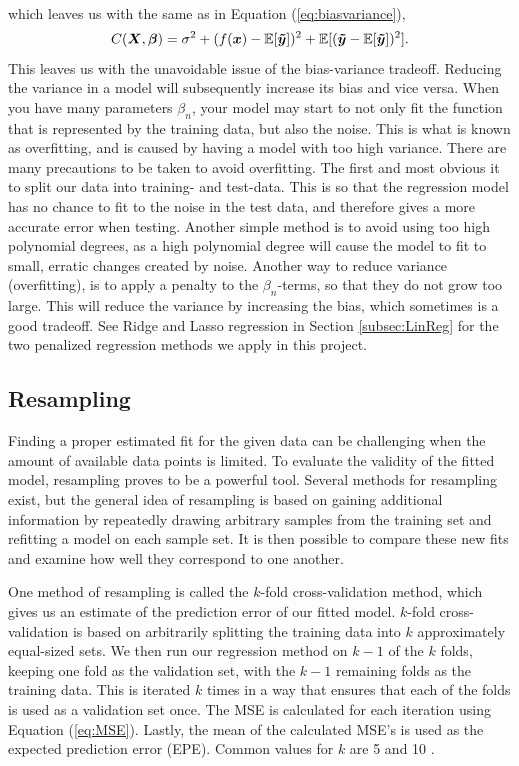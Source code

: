 \documentclass[a4paper, 10pt]{article}
\begin{document}
\begin{multicols}{2}
\begin{align*}
\end{align*}
which leaves us with the same as in Equation (\ref{eq:biasvariance}),
\begin{equation*}
C(\bm{X},\bm{\beta} ) =  \sigma^2 +  ( f(\bm{x}) -\mathbb{E}[\bm{\tilde{y}}]  )^2  +\mathbb{E}[(\bm{\tilde{y}} -\mathbb{E}[\bm{\tilde{y}}])^2]. \\
\end{equation*}
This leaves us with the unavoidable issue of the bias-variance tradeoff. Reducing the variance in a model will subsequently increase its bias and vice versa. 
When you have many parameters $\beta_n$, your model may start to not only fit the function that is represented by the training data, but also the noise. This is what is known as overfitting, and is caused by having a model with too high variance. There are many precautions to be taken to avoid overfitting. The first and most obvious it to split our data into training- and test-data. This is so that the regression model has no chance to fit to the noise in the test data, and therefore gives a more accurate error when testing. Another simple method is to avoid using too high polynomial degrees, as a high polynomial degree will cause the model to fit to small, erratic changes created by noise.
Another way to reduce variance (overfitting), is to apply a penalty to the $\beta_n$-terms, so that they do not grow too large. This will reduce the variance by increasing the bias, which sometimes is a good tradeoff. See Ridge and Lasso regression in Section \ref{subsec:LinReg} for the two penalized regression methods we apply in this project.

\subsection{Resampling}
Finding a proper estimated fit for the given data can be challenging when the amount of available data points is limited. To evaluate the validity of the fitted model, resampling proves to be a powerful tool. Several methods for resampling exist, but the general idea of resampling is based on gaining additional information by repeatedly drawing arbitrary samples from the training set and refitting a model on each sample set. It is then possible to compare these new fits and examine how well they correspond to one another.

One method of resampling is called the $k$-fold cross-validation method, which gives us an estimate of the prediction error of our fitted model. $k$-fold cross-validation is based on arbitrarily splitting the training data into $k$ approximately equal-sized sets.  We then run our regression method on $k-1$ of the $k$ folds, keeping one fold as the validation set, with the $k-1$ remaining folds as the training data. This is iterated $k$ times in a way that ensures that each of the folds is used as a validation set once. The MSE is calculated for each iteration using Equation (\ref{eq:MSE}). Lastly, the mean of the calculated MSE's is used as the expected prediction error (EPE).  Common values for $k$ are 5 and 10 \cite{hastie}. 



\end{multicols}
\end{document}
